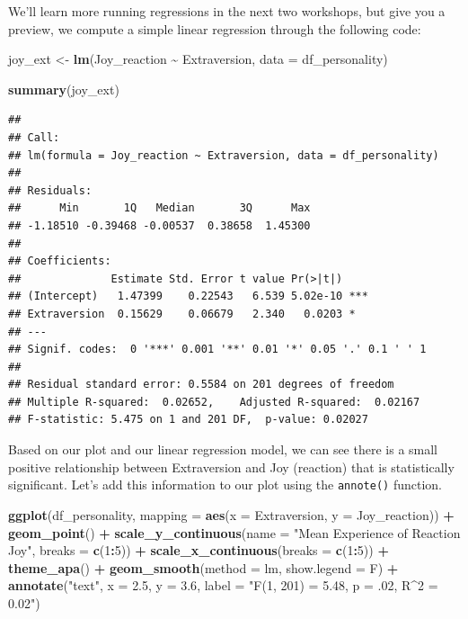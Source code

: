 \documentclass[
]{book}
\newenvironment{Shaded}{\begin{snugshade}}{\end{snugshade}}
\newcommand{\AttributeTok}[1]{\textcolor[rgb]{0.13,0.29,0.53}{#1}}
\newcommand{\DecValTok}[1]{\textcolor[rgb]{0.00,0.00,0.81}{#1}}
\newcommand{\FloatTok}[1]{\textcolor[rgb]{0.00,0.00,0.81}{#1}}
\newcommand{\FunctionTok}[1]{\textcolor[rgb]{0.13,0.29,0.53}{\textbf{#1}}}
\newcommand{\NormalTok}[1]{#1}
\newcommand{\OtherTok}[1]{\textcolor[rgb]{0.56,0.35,0.01}{#1}}
\newcommand{\SpecialCharTok}[1]{\textcolor[rgb]{0.81,0.36,0.00}{\textbf{#1}}}
\newcommand{\StringTok}[1]{\textcolor[rgb]{0.31,0.60,0.02}{#1}}
\begin{document}
We'll learn more running regressions in the next two workshops, but give you a preview, we compute a simple linear regression through the following code:

\begin{Shaded}
\begin{Highlighting}[]
\NormalTok{joy\_ext }\OtherTok{\textless{}{-}} \FunctionTok{lm}\NormalTok{(Joy\_reaction }\SpecialCharTok{\textasciitilde{}}\NormalTok{ Extraversion, }\AttributeTok{data =}\NormalTok{ df\_personality)}

\FunctionTok{summary}\NormalTok{(joy\_ext)}
\end{Highlighting}
\end{Shaded}

\begin{verbatim}
## 
## Call:
## lm(formula = Joy_reaction ~ Extraversion, data = df_personality)
## 
## Residuals:
##      Min       1Q   Median       3Q      Max 
## -1.18510 -0.39468 -0.00537  0.38658  1.45300 
## 
## Coefficients:
##              Estimate Std. Error t value Pr(>|t|)    
## (Intercept)   1.47399    0.22543   6.539 5.02e-10 ***
## Extraversion  0.15629    0.06679   2.340   0.0203 *  
## ---
## Signif. codes:  0 '***' 0.001 '**' 0.01 '*' 0.05 '.' 0.1 ' ' 1
## 
## Residual standard error: 0.5584 on 201 degrees of freedom
## Multiple R-squared:  0.02652,    Adjusted R-squared:  0.02167 
## F-statistic: 5.475 on 1 and 201 DF,  p-value: 0.02027
\end{verbatim}

Based on our plot and our linear regression model, we can see there is a small positive relationship between Extraversion and Joy (reaction) that is statistically significant. Let's add this information to our plot using the \texttt{annote()} function.

\begin{Shaded}
\begin{Highlighting}[]
\FunctionTok{ggplot}\NormalTok{(df\_personality, }\AttributeTok{mapping =} \FunctionTok{aes}\NormalTok{(}\AttributeTok{x =}\NormalTok{ Extraversion, }\AttributeTok{y =}\NormalTok{ Joy\_reaction)) }\SpecialCharTok{+}
  \FunctionTok{geom\_point}\NormalTok{() }\SpecialCharTok{+}
  \FunctionTok{scale\_y\_continuous}\NormalTok{(}\AttributeTok{name =} \StringTok{"Mean Experience of Reaction Joy"}\NormalTok{, }\AttributeTok{breaks =} \FunctionTok{c}\NormalTok{(}\DecValTok{1}\SpecialCharTok{:}\DecValTok{5}\NormalTok{)) }\SpecialCharTok{+}
  \FunctionTok{scale\_x\_continuous}\NormalTok{(}\AttributeTok{breaks =} \FunctionTok{c}\NormalTok{(}\DecValTok{1}\SpecialCharTok{:}\DecValTok{5}\NormalTok{)) }\SpecialCharTok{+}
  \FunctionTok{theme\_apa}\NormalTok{() }\SpecialCharTok{+}
  \FunctionTok{geom\_smooth}\NormalTok{(}\AttributeTok{method =}\NormalTok{ lm, }\AttributeTok{show.legend =}\NormalTok{ F) }\SpecialCharTok{+}
  \FunctionTok{annotate}\NormalTok{(}\StringTok{"text"}\NormalTok{, }\AttributeTok{x =} \FloatTok{2.5}\NormalTok{, }\AttributeTok{y =} \FloatTok{3.6}\NormalTok{,}
           \AttributeTok{label =} \StringTok{"F(1, 201) = 5.48, p = .02, R\^{}2 = 0.02"}\NormalTok{)}
\end{Highlighting}
\end{Shaded}
\end{document}

